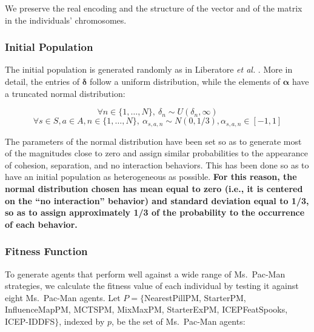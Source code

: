\documentclass[journal]{IEEEtran}
\begin{document}
We preserve the real encoding and the structure of the vector and of the matrix in the individuals' chromosomes.

\subsubsection{Initial Population}
The initial population is generated randomly as in Liberatore \emph{et al.} \cite{Liberatore2014}. More in detail, the entries of $\boldsymbol\delta$ follow a uniform distribution, while the elements of $\boldsymbol\alpha$ have a truncated normal distribution:

\begin{small}
\begin{equation}
	\label{eq:init_radius}
	\forall n \in \{1, \ldots, N\}, \: \delta_n \sim U(\delta_n,\infty)
\end{equation}
\begin{equation}
	\label{eq:init_magnitude}
	\forall s \in S, a \in A,  n \in \{1, \ldots, N\}, \: \alpha_{s,a,n} \sim N(0,1/3), \alpha_{s,a,n} \in [-1,1]
\end{equation}
\end{small}

The parameters of the normal distribution have been set so as to generate most of the magnitudes close to zero and assign similar probabilities to the appearance of cohesion, separation, and no interaction behaviors. This has been done so as to have an initial population as heterogeneous as possible. \textbf{For this reason, the normal distribution chosen has mean equal to zero (i.e., it is centered on the “no interaction” behavior) and standard deviation equal to 1/3, so as to assign approximately 1/3 of the probability to the occurrence of each behavior.}

\subsubsection{Fitness Function}
To generate agents that perform well against a wide range of Ms.\  Pac-Man strategies, we calculate the fitness value of each individual by testing it against eight Ms.\  Pac-Man agents. Let $P=\{$NearestPillPM, StarterPM, InfluenceMapPM, MCTSPM, MixMaxPM, StarterExPM, ICEPFeatSpooks, ICEP-IDDFS$\}$, indexed by $p$, be the set of Ms.\  Pac-Man agents:
\end{document}

